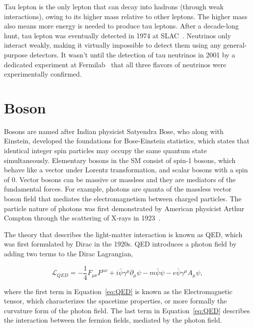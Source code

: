 Tau lepton is the only lepton that can decay into hadrons (through weak interactions), owing to its higher mass relative to other leptons. The higher mass also means more energy is needed to produce tau leptons. After a decade-long hunt, tau lepton was eventually detected in 1974 at SLAC~\cite{Perl:1975bf}. Neutrinos only interact weakly, making it virtually impossible to detect them using any general-purpose detectors. It wasn't until the detection of tau neutrinos in 2001 by a dedicated experiment at Fermilab~\cite{DONUT:2000fbd} that all three flavors of neutrinos were experimentally confirmed. 

\section{Boson}
\label{sec:Boson}

Bosons are named after Indian physicist Satyendra Bose, who along with Einstein, developed the foundations for Bose-Einstein statistics, which states that identical integer spin particles may occupy the same quantum state simultaneously. Elementary bosons in the \ac{SM} consist of spin-1 bosons, which behave like a vector under Lorentz transformation, and scalar bosons with a spin of 0. Vector bosons can be massive or massless and they are mediators of the fundamental forces. For example, photons are quanta of the massless vector boson field that mediates the electromagnetism between charged particles. The particle nature of photons was first demonstrated by American physicist Arthur Compton through the scattering of X-rays in 1923~\cite{PhysRev.21.483}.

The theory that describes the light-matter interaction is known as \ac{QED}, which was first formulated by Dirac in the 1920s. \ac{QED} introduces a photon field by adding two terms to the Dirac Lagrangian,

\begin{equation}
\label{eq:QED}
\mathcal{L}_{QED}=-\frac{1}{4}F_{\mu\nu}F^{\mu\nu}+i\bar{\psi}\gamma^{\mu}\partial_{\mu}\psi-m\bar{\psi}\psi-e\bar{\psi}\gamma^{\mu}A_{\mu}\psi,
\end{equation}

where the first term in Equation~\ref{eq:QED} is known as the Electromagnetic tensor, which characterizes the spacetime properties, or more formally the curvature form of the photon field. The last term in Equation~\ref{eq:QED} describes the interaction between the fermion fields, mediated by the photon field. 

